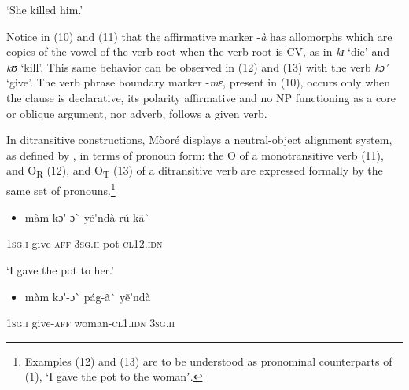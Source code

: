 \documentclass[output=paper]{langsci/langscibook}
\begin{document}
{\begin{styleTranslation}
‘She killed him.’
\end{styleTranslation}

Notice in (10) and (11) that the affirmative marker -\textit{\`{a}} has allomorphs which are copies of the vowel of the verb root when the verb root is CV, as in \textit{kɪ} ‘die’ and \textit{kʊ} ‘kill’. This same behavior can be observed in (12) and (13) with the verb \textit{kɔ\'{ }} ‘give’. The verb phrase boundary marker -\textit{mɛ}, present in (10), occurs only when the clause is declarative, its polarity affirmative and no NP functioning as a core or oblique argument, nor adverb, follows a given verb.  

In ditransitive constructions, M\`{o}or\'{e} displays a neutral-object alignment system, as defined by \citet{MalchukovEtAl2010}, in terms of pronoun form: the O of a monotransitive verb (11), and O\textsubscript{R} (12), and O\textsubscript{T} (13) of a ditransitive verb are expressed formally by the same set of pronouns.\footnote{{ }Examples (12) and (13) are to be understood as pronominal counterparts of (1), ‘I gave the pot to the womanʼ.  } 

\begin{itemize}
\item \begin{styleNumberedEX}
\label{bkm:Ref424141642}m\`{a}m    kɔ\'{ }-ɔ\`{ }      y\~{e}\'{ }nd\`{a}    r\'{u}-k\~{a}\`{ }
\end{styleNumberedEX}\end{itemize}
\begin{styleGloss}
\textsc{1sg.i  }  give-\textsc{aff}    \textsc{3sg.ii  }  pot\textsc{{}-cl12.idn}
\end{styleGloss}

\begin{styleTranslation}
‘I gave the pot to her.’
\end{styleTranslation}

\begin{itemize}
\item \begin{styleNumberedEX}
\label{bkm:Ref424141648}m\`{a}m    kɔ\'{ }-ɔ\`{ }    p\'{a}g-\~{a}\`{ }      y\~{e}\'{ }nd\`{a}
\end{styleNumberedEX}\end{itemize}
\begin{styleGloss}
\textsc{1sg.i  }  give-\textsc{aff}  woman-\textsc{cl1.idn}  \textsc{3sg.ii}
\end{styleGloss}

}
\end{document}

